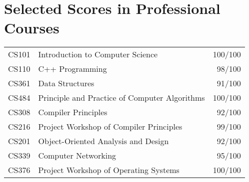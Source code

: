 \documentclass[letterpaper]{article}
\begin{document}
\section*{Selected Scores in Professional Courses}

\begin{tabular}{clr}
  CS101 & Introduction to Computer Science & 100/100 \\
  CS110 & C++ Programming & 98/100 \\
  CS361 & Data Structures & 91/100 \\
  CS484 & Principle and Practice of Computer Algorithms & 100/100 \\
  CS308 & Compiler Principles & 92/100 \\
  CS216 & Project Workshop of Compiler Principles & 99/100 \\
  CS201 & Object-Oriented Analysis and Design & 92/100 \\
  CS339 & Computer Networking & 95/100 \\
  CS376 & Project Workshop of Operating Systems & 100/100
\end{tabular}
\end{document}
